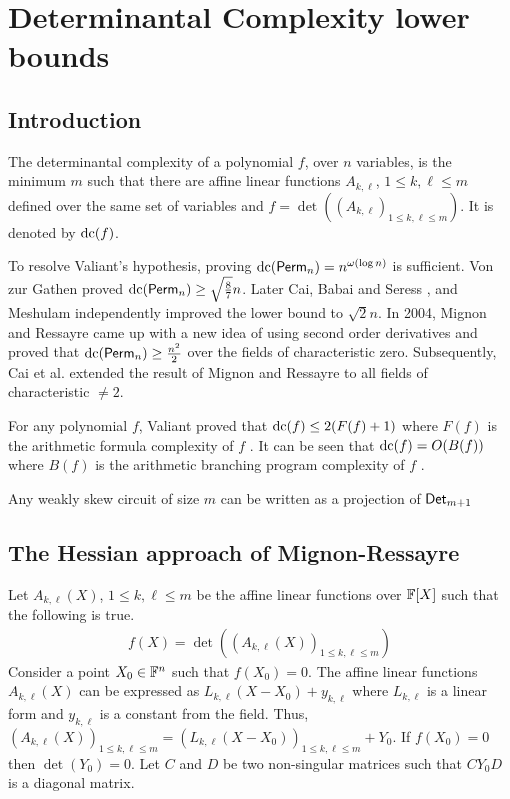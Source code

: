 \chapter{Determinantal Complexity lower bounds}\label{chap:dc}
\section{Introduction}
\begin{definition}
  The determinantal complexity of a polynomial $f$, over $n$ variables, is the minimum $m$ such that there are affine linear functions $A_{k,\ell}$, $1\leq k,\ell\leq m$ defined over the same set of variables and $f= \det((A_{k,\ell})_{1 \leq k,\ell \leq m})$. It is denoted by $\mathrm{dc}(f)$.  
\end{definition}
To resolve Valiant's hypothesis, proving $\mathrm{dc}(\mathsf{Perm}_n) = n^{\omega(\log n)}$ is sufficient. Von zur Gathen \cite{von1986}  proved $\mathrm{dc}(\mathsf{Perm}_n) \geq \sqrt{\frac{8}{7}}n$. Later Cai\cite{cai1990}, Babai and Seress \cite{von1987}, and Meshulam\cite{mesh1989} independently improved the lower bound to $\sqrt{2}n$. In 2004, Mignon and Ressayre\cite{mr04} came up with a new idea of using second order derivatives and proved that $\mathrm{dc}(\mathsf{Perm}_n) \geq \frac{n^2}{2}$ over the fields of characteristic zero. Subsequently, Cai et al.\cite{ccl2008} extended the result of Mignon and Ressayre to all fields of characteristic $\neq 2$.

For any polynomial $f$, Valiant proved that $\mathrm{dc}(f) \leq 2(F(f)+ 1)$ where $F(f)$ is the arithmetic formula complexity of $f$ \cite{v79}. It can be seen that $\mathrm{dc}(f) = O(B(f))$ where $B(f)$ is the arithmetic branching program complexity of $f$ \cite{mp08}.

\begin{remark}[\cite{mp08}]
  Any weakly skew circuit of size $m$ can be written as a projection of $\mathsf{Det}_{m+1}$
\end{remark}


\section{The Hessian approach of Mignon-Ressayre}

 Let $A_{k,\ell}(X)$, $1\leq k,\ell\leq m$ be the affine linear functions over $\mathbb{F}[X]$ such that the following is true.
\begin{align*}
  f(X) = \det((A_{k,\ell}(X))_{1\leq k,\ell\leq m})
\end{align*}
 Consider a point $X_0\in \mathbb{F}^{n}$ such that $f(X_0)=0$. The affine linear functions $A_{k,\ell}(X)$ can be expressed as $L_{k,\ell}(X-X_0) + y_{k,\ell}$ where $L_{k,\ell}$ is a linear form and $y_{k,\ell}$ is a constant from the field. Thus, $(A_{k,\ell}(X))_{1\leq k,\ell\leq m} = (L_{k,\ell}(X-X_0))_{1\leq k,\ell\leq m} + Y_0$. If $f(X_0)=0$ then $\det(Y_0)=0$. Let $C$ and $D$ be two non-singular matrices such that $CY_0D$ is a diagonal matrix.

